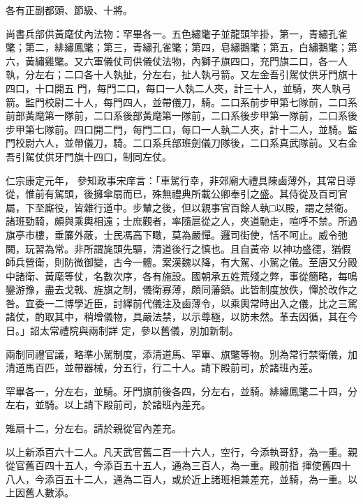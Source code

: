\begin{pinyinscope}
 各有正副都頭、節級、十將。



 尚書兵部供黃麾仗內法物：罕畢各一。五色繡氅子並龍頭竿掛，第一，青繡孔雀氅；第二，緋繡鳳氅；第三，青繡孔雀氅；第四，皂繡鵝氅；第五，白繡鵝氅；第六，黃繡雞氅。又六軍儀仗司供儀仗法物，內獅子旗四口，充門旗二口，各一人執，分左右；二口各十人執扯，分左右，扯人執弓箭。又左金吾引駕仗供牙門旗十四口，十口開五
 門，每門二口，每口一人執二人夾，計三十人，並騎，夾人執弓箭。監門校尉二十人，每門四人，並帶儀刀，騎。二口系前步甲第七隊前，二口系前部黃麾第一隊前，二口系後部黃麾第一隊前，二口系後步甲第一隊前，二口系後步甲第七隊前。四口開二門，每門二口，每口一人執二人夾，計十二人，並騎。監門校尉六人，並帶儀刀，騎。二口系兵部班劍儀刀隊後，二口系真武隊前。又右金吾引駕仗供牙門旗十四口，制同左仗。



 仁宗康定元年，
 參知政事宋庠言：「車駕行幸，非郊廟大禮具陳鹵薄外，其常日導從，惟前有駕頭，後擁傘扇而已，殊無禮典所載公卿奉引之盛。其侍從及百司官屬，下至廝役，皆雜行道中。步輦之後，但以親事官百餘人執□以殿，謂之禁衛。諸班勁騎，頗與乘輿相遠；士庶觀者，率隨扈從之人，夾道馳走，喧呼不禁。所過旗亭市樓，垂簾外蔽，士民馮高下瞰，莫為嚴憚。邏司街使，恬不呵止。威令弛闕，玩習為常。非所謂旄頭先驅，清道後行之慎也。且自黃帝
 以神功盛德，猶假師兵營衛，則防微御變，古今一體。案漢魏以降，有大駕、小駕之儀。至唐又分殿中諸衛、黃麾等仗，名數次序，各有施設。國朝承五姓荒殘之弊，事從簡略，每鳴鑾游豫，盡去戈戟、旌旗之制，儀衛寡薄，頗同藩鎮。此皆制度放佚，憚於改作之咎。宜委一二博學近臣，討繹前代儀注及鹵薄令，以乘輿常時出入之儀，比之三駕諸仗，酌取其中，稍增儀物，具嚴法禁，以示尊極，以防未然。革去因循，其在今日。」詔太常禮院與兩制詳
 定，參以舊儀，別加新制。



 兩制同禮官議，略準小駕制度，添清道馬、罕畢、旗氅等物。別為常行禁衛儀，加清道馬百匹，並帶器械，分五行，行二十人。請下殿前司，於諸班內差。



 罕畢各一，分左右，並騎。牙門旗前後各四，分左右，並騎。緋繡鳳氅二十四，分左右，並騎。以上請下殿前司，於諸班內差充。



 雉扇十二，分左右。請於親從官內差充。



 以上新添百六十二人。凡天武官舊二百一十六人，空行，今添執哥舒，為一重。親從官舊百四十五人，今添百五十五人，通為三百人，為一重。殿前指
 揮使舊四十八人，今添百五十二人，通為二百人，或於近上諸班相兼差充，並騎，為一重。以上因舊人數添。




\end{pinyinscope}
